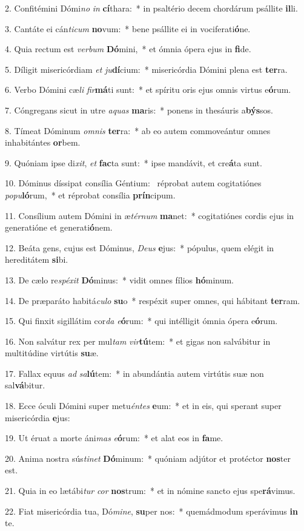 2. Confitémini Dómi\textit{no} \textit{in} \textbf{cí}thara:~*  in psaltério decem chordárum psállite \textbf{il}li.\

3. Cantáte ei cán\textit{ti}\textit{cum} \textbf{no}vum:~*  bene psállite ei in vociferati\textbf{ó}ne.\

4. Quia rectum est \textit{ver}\textit{bum} \textbf{Dó}mini,~*  et ómnia ópera ejus in \textbf{fi}de.\

5. Díligit misericórdiam \textit{et} \textit{ju}\textbf{dí}cium:~*  misericórdia Dómini plena est \textbf{ter}ra.\

6. Verbo Dómini cæ\textit{li} \textit{fir}\textbf{má}ti sunt:~*  et spíritu oris ejus omnis virtus e\textbf{ó}rum.\

7. Cóngregans sicut in utre \textit{a}\textit{quas} \textbf{ma}ris:~*  ponens in thesáuris a\textbf{býs}sos.\

8. Tímeat Dóminum \textit{om}\textit{nis} \textbf{ter}ra:~*  ab eo autem commoveántur omnes inhabitántes \textbf{or}bem.\

9. Quóniam ipse di\textit{xit}, \textit{et} \textbf{fac}ta sunt:~*  ipse mandávit, et cre\textbf{á}ta sunt.\

10. Dóminus díssipat consília Géntium: \dag\  réprobat autem cogitatiónes \textit{po}\textit{pu}\textbf{ló}rum,~*  et réprobat consília \textbf{prín}cipum.\

11. Consílium autem Dómini in æ\textit{tér}\textit{num} \textbf{ma}net:~*  cogitatiónes cordis ejus in generatióne et generati\textbf{ó}nem.\

12. Beáta gens, cujus est Dóminus, \textit{De}\textit{us} \textbf{e}jus:~*  pópulus, quem elégit in hereditátem \textbf{si}bi.\

13. De cælo re\textit{spé}\textit{xit} \textbf{Dó}minus:~*  vidit omnes fílios \textbf{hó}minum.\

14. De præparáto habitá\textit{cu}\textit{lo} \textbf{su}o~*  respéxit super omnes, qui hábitant \textbf{ter}ram.\

15. Qui finxit sigillátim cor\textit{da} \textit{e}\textbf{ó}rum:~*  qui intélligit ómnia ópera e\textbf{ó}rum.\

16. Non salvátur rex per mul\textit{tam} \textit{vir}\textbf{tú}tem:~*  et gigas non salvábitur in multitúdine virtútis \textbf{su}æ.\

17. Fallax equus \textit{ad} \textit{sa}\textbf{lú}tem:~*  in abundántia autem virtútis suæ non sal\textbf{vá}bitur.\

18. Ecce óculi Dómini super metu\textit{én}\textit{tes} \textbf{e}um:~*  et in eis, qui sperant super misericórdia \textbf{e}jus:\

19. Ut éruat a morte áni\textit{mas} \textit{e}\textbf{ó}rum:~*  et alat eos in \textbf{fa}me.\

20. Anima nostra sús\textit{ti}\textit{net} \textbf{Dó}minum:~*  quóniam adjútor et protéctor \textbf{nos}ter est.\

21. Quia in eo lætábi\textit{tur} \textit{cor} \textbf{nos}trum:~*  et in nómine sancto ejus spe\textbf{rá}vimus.\

22. Fiat misericórdia tua, Dó\textit{mi}\textit{ne}, \textbf{su}per nos:~*  quemádmodum sperávimus \textbf{in} te.\

